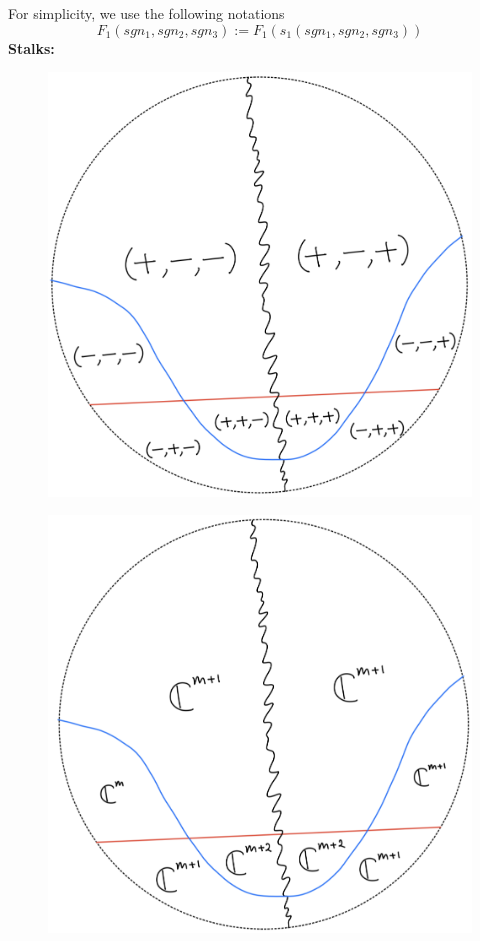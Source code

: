 For simplicity, we use the following notations
\[
F_1(sgn_1,sgn_2,sgn_3):= F_1(s_1(sgn_1,sgn_2,sgn_3))
\]
\textbf{Stalks:}
\begin{figure}[H]
    \centering
    \includegraphics[scale = 0.95]{diagrams/lemma1/31.png} 
    \caption{}
    \label{fig:your-label}
\end{figure}
\begin{figure}[H]
    \centering
    \includegraphics[scale = 0.95]{diagrams/lemma1/32.png} 
    \caption{}
    \label{fig:your-label}
\end{figure}
